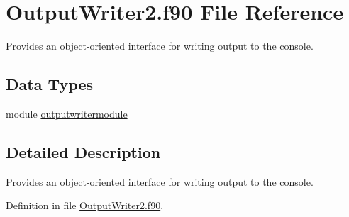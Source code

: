 \hypertarget{_output_writer2_8f90}{\section{Output\+Writer2.\+f90 File Reference}
\label{_output_writer2_8f90}
}


Provides an object-\/oriented interface for writing output to the console.  


\subsection*{Data Types}
\begin{DoxyCompactItemize}
\item 
module \hyperlink{classoutputwritermodule}{outputwritermodule}
\end{DoxyCompactItemize}


\subsection{Detailed Description}
Provides an object-\/oriented interface for writing output to the console. 



Definition in file \hyperlink{_output_writer2_8f90_source}{Output\+Writer2.\+f90}.

